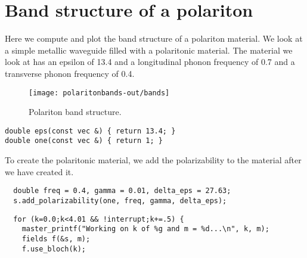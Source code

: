 \section{Band structure of a polariton}

\begin{comment}
#include <stdio.h>
#include <stdlib.h>

#include <meep.h>
using namespace meep;

const double rmax = 1.0;
\end{comment}

Here we compute and plot the band structure of a polariton material.  We
look at a simple metallic waveguide filled with a polaritonic material.
The material we look at has an epsilon of 13.4 and a longitudinal phonon
frequency of 0.7 and a transverse phonon frequency of 0.4.

\begin{figure}
\label{polaritonbands}
\caption{Polariton band structure.}
\texttt{[image: polaritonbands-out/bands]}
\end{figure}

\begin{verbatim}
double eps(const vec &) { return 13.4; }
double one(const vec &) { return 1; }
\end{verbatim}

\begin{comment}
int main(int argc, char **argv) {
  initialize mpi(argc, argv);
  deal_with_ctrl_c();
  const int a = 10;
  const int m = 0;
  double k;
  const double ttot = 1000;  
\end{comment}

\begin{comment}
  structure s(volcyl(rmax, 0.0, a), eps);
  const char *dirname = make_output_directory(__FILE__);
  s.set_output_directory(dirname);
  grace g("bands", dirname);
  g.set_range(0.0, 4.0, 0.0, 1.1);
\end{comment}

To create the polaritonic material, we add the polarizability to the
material after we have created it.

\begin{verbatim}
  double freq = 0.4, gamma = 0.01, delta_eps = 27.63;
  s.add_polarizability(one, freq, gamma, delta_eps);
\end{verbatim}

\begin{verbatim}
  for (k=0.0;k<4.01 && !interrupt;k+=.5) {
    master_printf("Working on k of %g and m = %d...\n", k, m);
    fields f(&s, m);
    f.use_bloch(k);
\end{verbatim}

